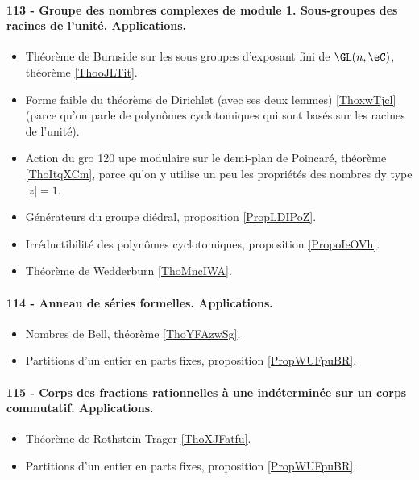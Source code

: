 \paragraph{113 - Groupe des nombres complexes de module 1. Sous-groupes des racines de l’unité. Applications.}
\begin{itemize}
    \item Théorème de Burnside sur les sous groupes d'exposant fini de \( \GL(n,\eC)\), théorème \ref{ThooJLTit}.
    \item Forme faible du théorème de Dirichlet (avec ses deux lemmes) \ref{ThoxwTjcl} (parce qu'on parle de polynômes cyclotomiques qui sont basés sur les racines de l'unité).
    \item Action du gro  120  upe modulaire sur le demi-plan de Poincaré, théorème \ref{ThoItqXCm}, parce qu'on y utilise un peu les propriétés des nombres dy type \( | z |=1\).
    \item Générateurs du groupe diédral, proposition \ref{PropLDIPoZ}.
    \item Irréductibilité des polynômes cyclotomiques, proposition \ref{PropoIeOVh}.
    \item Théorème de Wedderburn \ref{ThoMncIWA}.
\end{itemize}

\paragraph{114 - Anneau de séries formelles. Applications.}
\begin{itemize}
    \item Nombres de Bell, théorème \ref{ThoYFAzwSg}.
    \item Partitions d'un entier en parts fixes, proposition \ref{PropWUFpuBR}.
\end{itemize}

\paragraph{115 - Corps des fractions rationnelles à une indéterminée sur un corps commutatif. Applications.}
\begin{itemize}
    \item Théorème de Rothstein-Trager \ref{ThoXJFatfu}.
    \item Partitions d'un entier en parts fixes, proposition \ref{PropWUFpuBR}.
\end{itemize}

